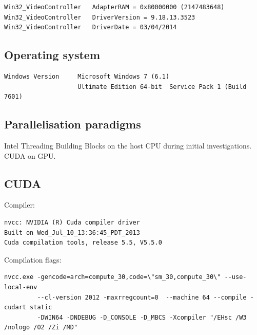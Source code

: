 \documentclass[11pt, oneside, a4paper]{article}
\begin{document}
\begin{appendices}
\begin{verbatim}
Win32_VideoController   AdapterRAM = 0x80000000 (2147483648)
Win32_VideoController   DriverVersion = 9.18.13.3523
Win32_VideoController   DriverDate = 03/04/2014
\end{verbatim}

\subsection{Operating system} %
\label{sub:operating_system}
\begin{verbatim}
Windows Version     Microsoft Windows 7 (6.1)
                    Ultimate Edition 64-bit  Service Pack 1 (Build 7601) 
\end{verbatim}

\subsection{Parallelisation paradigms} %
\label{sub:parallelisation_paradigms}
Intel Threading Building Blocks on the host CPU during initial investigations. CUDA on GPU.

\subsection{CUDA} %
\label{sub:cuda}
Compiler:
\begin{verbatim}
nvcc: NVIDIA (R) Cuda compiler driver
Built on Wed_Jul_10_13:36:45_PDT_2013
Cuda compilation tools, release 5.5, V5.5.0
\end{verbatim}
Compilation flags:
\begin{verbatim}
nvcc.exe -gencode=arch=compute_30,code=\"sm_30,compute_30\" --use-local-env 
         --cl-version 2012 -maxrregcount=0  --machine 64 --compile -cudart static 
         -DWIN64 -DNDEBUG -D_CONSOLE -D_MBCS -Xcompiler "/EHsc /W3 /nologo /O2 /Zi /MD"
\end{verbatim}

\end{appendices}
\clearpage
\end{document}
